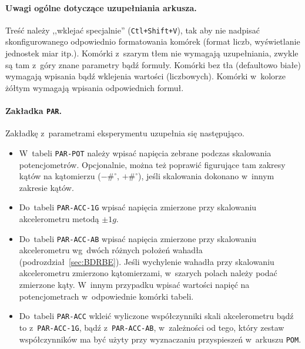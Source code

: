 \documentclass[paper=a4,DIV=12]{lpas}
\begin{document}
\paragraph{Uwagi ogólne dotyczące uzupełniania arkusza.} Treść należy
,,wklejać specjalnie'' (\texttt{Ctl+Shift+V}), tak aby nie nadpisać
skonfigurowanego odpowiednio formatowania komórek (format liczb, wyświetlanie
jednostek miar itp.). Komórki z~szarym tłem nie wymagają uzupełniania, zwykle
są tam z~góry znane parametry bądź formuły. Komórki bez tła (defaultowo białe)
wymagają wpisania bądź wklejenia wartości (liczbowych). Komórki w~kolorze
żółtym wymagają wpisania odpowiednich formuł.

\paragraph{Zakładka \texttt{PAR}.} Zakładkę z~parametrami eksperymentu
uzupełnia się następująco.
\begin{itemize}
  \item W~tabeli \texttt{PAR-POT} należy wpisać napięcia zebrane podczas
    skalowania potencjometrów. Opcjonalnie, można też poprawić figurujące tam
    zakresy kątów na kątomierzu ($-\#^{\circ}$, $+\#^{\circ}$), jeśli
    skalowania dokonano w~innym zakresie kątów.
  \item Do~tabeli \texttt{PAR-ACC-1G} wpisać napięcia zmierzone przy
    skalowaniu akcelerometru metodą $\pm 1g$.
  \item Do~tabeli \texttt{PAR-ACC-AB} wpisać napięcia zmierzone przy skalowaniu
    akcelerometru wg~dwóch różnych położeń wahadła
    (podrozdział~\ref{sec:BDRBE}). Jeśli wychylenie wahadła przy skalowaniu
    akcelerometru zmierzono kątomierzami, w~szarych polach należy podać
    zmierzone kąty. W~innym przypadku wpisać wartości napięć na potencjometrach
    w~odpowiednie komórki tabeli.
  \item Do~tabeli \texttt{PAR-ACC} wkleić wyliczone współczynniki skali
    akcelerometru bądź to z~\texttt{PAR-ACC-1G}, bądź z~\texttt{PAR-ACC-AB},
    w~zależności od tego, który zestaw współczynników ma być użyty przy
    wyznaczaniu przyspieszeń w~arkuszu \texttt{POM}.
\end{itemize}
\end{document}
